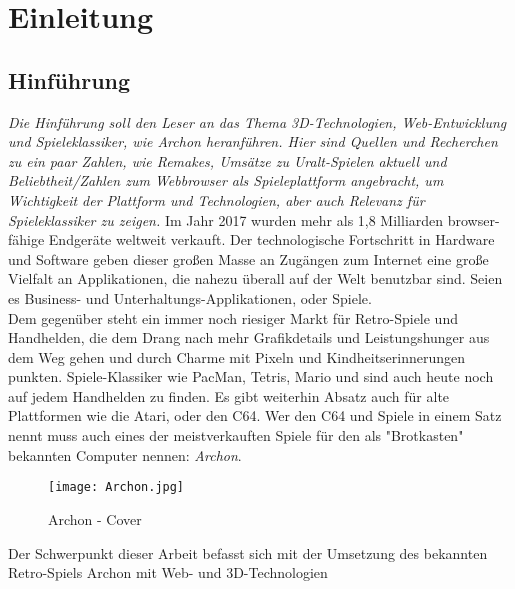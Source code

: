 \chapter{Einleitung}
\label{cha:Einleitung}

\section{Hinführung}
\label{sec:hinfuhrung}

\emph{Die Hinführung soll den Leser an das Thema 3D-Technologien, Web-Entwicklung und Spieleklassiker, wie Archon heranführen. Hier sind Quellen und Recherchen zu ein paar Zahlen, wie Remakes, Umsätze zu Uralt-Spielen aktuell und Beliebtheit/Zahlen zum Webbrowser als Spieleplattform angebracht, um Wichtigkeit der Plattform und Technologien, aber auch Relevanz für Spieleklassiker zu zeigen.}
Im Jahr 2017 wurden mehr als 1,8 Milliarden browser-fähige Endgeräte weltweit verkauft. Der technologische Fortschritt in Hardware und Software geben dieser großen Masse an Zugängen zum Internet eine große Vielfalt an Applikationen, die nahezu überall auf der Welt benutzbar sind. Seien es Business- und Unterhaltungs-Applikationen, oder Spiele.\\
Dem gegenüber steht ein immer noch riesiger Markt für Retro-Spiele und Handhelden, die dem Drang nach mehr Grafikdetails und Leistungshunger aus dem Weg gehen und durch Charme mit Pixeln und Kindheitserinnerungen punkten. Spiele-Klassiker wie PacMan, Tetris, Mario und \uvm sind auch heute noch auf jedem Handhelden zu finden. Es gibt weiterhin Absatz auch für alte Plattformen wie die Atari, oder den C64. Wer den C64 und Spiele in einem Satz nennt muss auch eines der meistverkauften Spiele für den als "Brotkasten" bekannten Computer nennen: \emph{Archon}.\\
\begin{figure}[htp]
\centering
\captionsetup{justification=centering}
\texttt{[image: Archon.jpg]}
\caption[Archon - Cover]{Archon - Cover\footnotemark}
\label{fig:Archon_Cover}
\end{figure}


Der Schwerpunkt dieser Arbeit befasst sich mit der Umsetzung des bekannten Retro-Spiels Archon mit Web- und 3D-Technologien


